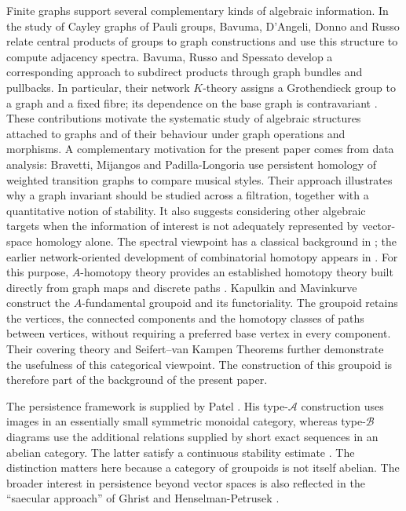 \documentclass{amsart}
\begin{document}
Finite graphs support several complementary kinds of algebraic information. In the study of Cayley graphs of Pauli groups, Bavuma, D'Angeli, Donno and Russo \cite{badadoru} relate central products of groups to graph constructions and use this structure to compute adjacency spectra. Bavuma, Russo and Spessato \cite[Theorems~4, 6--8 and Section~4.2]{barusp} develop a corresponding approach to subdirect products through graph bundles and pullbacks. In particular, their network $K$-theory assigns a Grothendieck group to a graph and a fixed fibre; its dependence on the base graph is contravariant \cite[Definition~9 and Corollary~3]{barusp}. These contributions motivate the systematic study of algebraic structures attached to graphs and of their behaviour under graph operations and morphisms. A complementary motivation for the present paper comes from data analysis: Bravetti, Mijangos and Padilla-Longoria \cite{martinealessandro} use persistent homology of weighted transition graphs to compare musical styles. Their approach illustrates why a graph invariant should be studied across a filtration, together with a quantitative notion of stability. It also suggests considering other algebraic targets when the information of interest is not adequately represented by vector-space homology alone. The spectral viewpoint has a classical background in \cite{spectrabook}; the earlier network-oriented development of combinatorial homotopy appears in \cite{psapm,foundations}. For this purpose, $A$-homotopy theory provides an established homotopy theory built directly from graph maps and discrete paths \cite[Section~2]{Babson2006}. Kapulkin and Mavinkurve \cite[Definition~3.4 and Proposition~3.5]{kapulkin_grupoid} construct the $A$-fundamental groupoid and its functoriality. The groupoid retains the vertices, the connected components and the homotopy classes of paths between vertices, without requiring a preferred base vertex in every component. Their covering theory and Seifert--van Kampen Theorems \cite[Sections~4--5]{kapulkin_grupoid} further demonstrate the usefulness of this categorical viewpoint. The construction of this groupoid is therefore part of the background of the present paper.

The persistence framework is supplied by Patel \cite[Sections~2, 6--8]{patel2016generalized}. His type-$\mathcal A$ construction uses images in an essentially small symmetric monoidal category, whereas type-$\mathcal B$ diagrams use the additional relations supplied by short exact sequences in an abelian category. The latter satisfy a continuous stability estimate \cite[Theorem~8.2]{patel2016generalized}. The distinction matters here because a category of groupoids is not itself abelian. The broader interest in persistence beyond vector spaces is also reflected in the ``saecular approach'' of Ghrist and Henselman-Petrusek \cite[Introduction]{ghristhenspet2021}.
\end{document}

